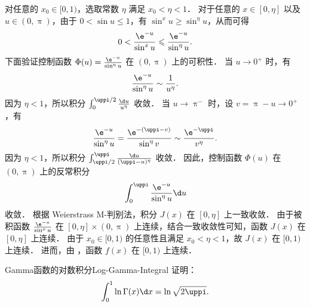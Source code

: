 \begin{myproof}
    对任意的 $x_0 \in [0, 1)$，选取常数 $\eta$ 满足 $x_0 < \eta < 1$．
    对于任意的 $x \in [0, \eta]$ 以及 $u \in (0, \uppi)$，由于 $0 < \sin u \leqslant 1$，有 $\sin^x u \geqslant \sin^{\eta} u$，从而可得
    \begin{equation}\label{eq:q10-bound-6}
        0 < \frac{\e^{-u}}{\sin^x u} \leqslant \frac{\e^{-u}}{\sin^{\eta} u}.
    \end{equation}
    下面验证控制函数 $\Phi(u) = \frac{\e^{-u}}{\sin^{\eta} u}$ 在 $(0, \uppi)$ 上的可积性．
    当 $u \to 0^+$ 时，有
    \begin{equation}\label{eq:q10-limit-left-7}
        \frac{\e^{-u}}{\sin^{\eta} u} \sim \frac{1}{u^{\eta}}.
    \end{equation}
    因为 $\eta < 1$，所以积分 $\int_0^{\uppi/2} \frac{\d u}{u^{\eta}}$ 收敛．
    当 $u \to \uppi^-$ 时，设 $v = \uppi - u \to 0^+$，有
    \begin{equation}\label{eq:q10-limit-right-8}
        \frac{\e^{-u}}{\sin^{\eta} u} = \frac{\e^{-(\uppi-v)}}{\sin^{\eta} v} \sim \frac{\e^{-\uppi}}{v^{\eta}}.
    \end{equation}
    因为 $\eta < 1$，所以积分 $\int_{\uppi/2}^{\uppi} \frac{\d u}{(\uppi - u)^{\eta}}$ 收敛．
    因此，控制函数 $\Phi(u)$ 在 $(0, \uppi)$ 上的反常积分
    \begin{equation}\label{eq:q10-majorant-9}
        \int_0^{\uppi} \frac{\e^{-u}}{\sin^{\eta} u} \d u
    \end{equation}
    收敛．
    根据 Weierstrass M-判别法，积分 $J(x)$ 在 $[0, \eta]$ 上一致收敛．
    由于被积函数 $\frac{\e^{-u}}{\sin^x u}$ 在 $[0, \eta] \times (0, \uppi)$ 上连续，结合一致收敛性可知，函数 $J(x)$ 在 $[0, \eta]$ 上连续．
    由于 $x_0 \in [0, 1)$ 的任意性且满足 $x_0 < \eta < 1$，故 $J(x)$ 在 $[0, 1)$ 上连续．
    进而，由 ，函数 $f(x)$ 在 $[0, 1)$ 上连续．
\end{myproof}

\begin{problem}{Gamma函数的对数积分}{Log-Gamma-Integral}
    证明：
    \begin{equation}\label{eq:q11-target}
        \int_0^1 \ln \Gamma(x) \d x = \ln \sqrt{2 \uppi}.
    \end{equation}
\end{problem}

